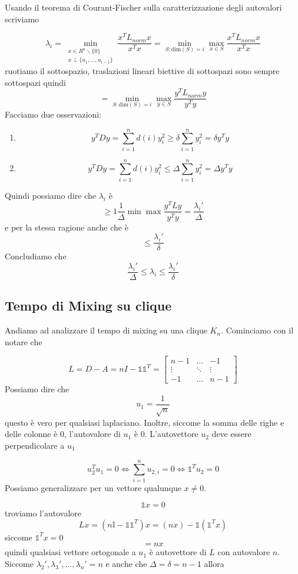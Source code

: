 \documentclass[12pt]{report}
\begin{document}
\begin{dimo}
    Usando il teorema di Courant-Fischer  sulla caratterizzazione degli autovalori scriviamo

    $$\lambda_i = \min_{\substack{x \in R^n \backslash \{0\}\\ x \perp \{u_1,\dots,u_{i-1}\}}} \frac{x^TL_{norm}x}{x^Tx} = \min_{S: \text{dim}(S) = i} \max_{x \in S}  \frac{x^TL_{norm}x}{x^Tx}$$
    ruotiamo il sottospazio, traslazioni lineari biettive di sottospazi sono sempre sottospazi quindi
    $$= \min_{S: \text{dim}(S) = i} \max_{y \in S}  \frac{y^TL_{norm}y}{y^Ty}$$
    Facciamo due osservazioni:
    \begin{enumerate}
        \item $$y^T D y = \sum_{i=1}^n d(i) y_i^2 \geq \delta \sum_{i=1}^n  y_i^2 = \delta y^Ty$$
        \item $$y^T D y = \sum_{i=1}^n d(i) y_i^2 \leq \Delta \sum_{i=1}^n  y_i^2 = \Delta y^Ty$$
    \end{enumerate}
    Quindi possiamo dire che $\lambda_i$ è
    $$\geq 1\frac{1}{\Delta} \min \max \frac{y^TLy}{y^Ty} = \frac{\lambda_i'}{\Delta}$$
    e per la stessa ragione anche che è
    $$\leq \frac{\lambda_i'}{\delta}$$
    Concludiamo che
    $$\frac{\lambda_i'}{\Delta} \leq  \lambda_i \leq \frac{\lambda_i'}{\delta}$$
\end{dimo}
\subsection{Tempo di Mixing su clique}
Andiamo ad analizzare il tempo di mixing su una clique $K_n$. Cominciamo con il notare che

\[
    L = D - A = n I - \mathds{1} \mathds{1}^T = \begin{bmatrix}
        n-1 & \dots & -1 \\
        \vdots & \ddots & \vdots \\
        -1 & \dots & n-1
    \end{bmatrix}
\]
Possiamo dire che 
$$u_1 = \frac{1}{\sqrt{n}}$$
questo è vero per qualsiasi laplaciano. Inoltre, siccome la somma delle righe e delle colonne è $0$, l'autovalore di $u_1$ è $0$. L'autovettore $u_2$ deve essere perpendicolare a $u_1$

$$u_2^T u_1 = 0 \Leftrightarrow \sum_{i=1}^n u_{2,i} = 0 \Leftrightarrow \mathds{1}^T u_2 = 0$$
Possiamo generalizzare per un vettore qualunque $x \neq 0$.

$$\mathds{1}x = 0$$
troviamo l'autovalore
$$Lx = (n\mathds{I} - \mathds{1}\mathds{1}^T)x = (nx) - \mathds{1}(\mathds{1}^Tx)$$
siccome $\mathds{1}^Tx = 0$
$$ = nx$$
quindi qualsiasi vettore ortogonale a $u_1$ è autovettore di $L$ con autovalore $n$. Siccome  $\lambda_2',\lambda_3',\dots,\lambda_n' = n$  e anche che $\Delta = \delta = n-1$ allora
\end{document}
